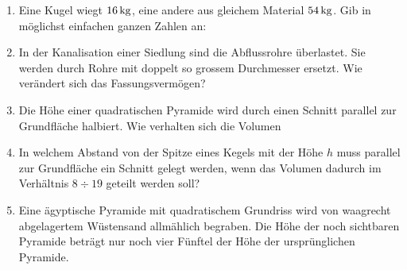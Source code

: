 \documentclass[%
11pt,%
twoside,%
titlepage,%
german,%
headsepline%
]{scrartcl}
\begin{document}
\begin{enumerate}
\item Eine Kugel wiegt $\unit[16]{kg}$, eine andere aus gleichem Material $\unit[54]{kg}$. Gib in m\"oglichst einfachen ganzen Zahlen an:
\item In der Kanalisation einer Siedlung sind die Abflussrohre \"uberlastet. Sie werden durch Rohre mit doppelt so grossem Durchmesser ersetzt. Wie ver\"andert sich das Fassungsverm\"ogen?
\item Die H\"ohe einer quadratischen Pyramide wird durch einen Schnitt parallel zur Grundfl\"ache halbiert. Wie verhalten sich die Volumen
\item In welchem Abstand von der Spitze eines Kegels mit der H\"ohe $h$ muss parallel zur Grundfl\"ache ein Schnitt gelegt werden, wenn das Volumen dadurch im Verh\"altnis $8\div19$ geteilt werden soll?

\item Eine \"agyptische Pyramide mit quadratischem Grundriss wird von waagrecht abgelagertem W\"ustensand allm\"ahlich begraben. Die H\"ohe der noch sichtbaren Pyramide betr\"agt nur noch vier F\"unftel der H\"ohe der urspr\"unglichen Pyramide.


\end{enumerate}
\end{document}
